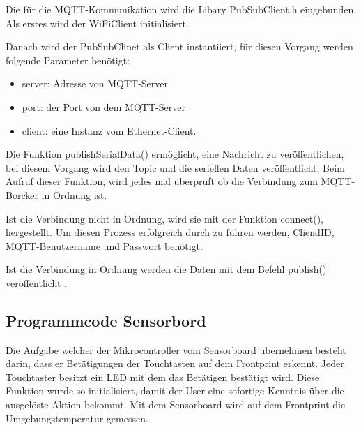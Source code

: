 Die für die MQTT-Kommunikation wird die Libary PubSubClient.h eingebunden. Als erstes wird der WiFiClient initialisiert. 

Danach wird der PubSubClinet als Client instantiiert, für diesen Vorgang werden folgende Parameter benötigt:\\
\begin{itemize}
\item 	server: Adresse von MQTT-Server\\
\item 	port: der Port von dem MQTT-Server\\
\item 	client: eine Instanz vom Ethernet-Client.\\
\end{itemize}
Die Funktion publishSerialData() ermöglicht, eine Nachricht zu veröffentlichen, bei diesem Vorgang wird den Topic und die seriellen Daten veröffentlicht. Beim Aufruf dieser Funktion, wird jedes mal überprüft ob die Verbindung zum MQTT-Borcker in Ordnung ist. 

Ist die Verbindung nicht in Ordnung, wird sie mit der Funktion connect(), hergestellt. Um diesen Prozess erfolgreich durch zu führen werden, CliendID, MQTT-Benutzername und Passwort benötigt.

Ist die Verbindung in Ordnung werden die Daten mit dem Befehl publish() veröffentlicht \cite{noauthor_arduino_nodate-1}.

\subsection{Programmcode Sensorbord}
Die Aufgabe welcher der Mikrocontroller vom Sensorboard  übernehmen besteht darin, dass er Betätigungen der Touchtasten auf dem Frontprint erkennt. Jeder Touchtaster besitzt ein LED mit dem das Betätigen bestätigt wird. Diese Funktion wurde so initialisiert, damit der User eine sofortige Kenntnis über die ausgelöste Aktion bekommt. Mit dem Sensorboard wird auf dem Frontprint die Umgebungstemperatur gemessen.



